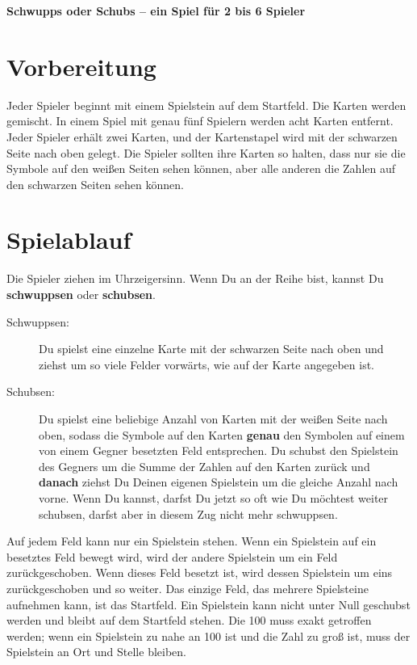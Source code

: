 \documentclass{article}
\begin{document}
{\center\LARGE\textbf{Schwupps oder Schubs -- ein Spiel für 2 bis 6 Spieler}}

\section*{Vorbereitung}

Jeder Spieler beginnt mit einem Spielstein auf dem Startfeld. Die Karten werden gemischt. In einem Spiel mit genau fünf Spielern werden acht Karten entfernt. Jeder Spieler erhält zwei Karten, und der Kartenstapel wird mit der schwarzen Seite nach oben gelegt. Die Spieler sollten ihre Karten so halten, dass nur sie die Symbole auf den weißen Seiten sehen können, aber alle anderen die Zahlen auf den schwarzen Seiten sehen können.

\section*{Spielablauf}

Die Spieler ziehen im Uhrzeigersinn. Wenn Du an der Reihe bist, kannst Du \textbf{schwuppsen} oder \textbf{schubsen}.

\begin{description}

\item[Schwuppsen:] 

Du spielst eine einzelne Karte mit der schwarzen Seite nach oben und ziehst um so viele Felder vorwärts, wie auf der Karte angegeben ist.

\item[Schubsen:]

Du spielst eine beliebige Anzahl von Karten mit der weißen Seite nach oben, sodass die Symbole auf den Karten \textbf{genau} den Symbolen auf einem von einem Gegner besetzten Feld entsprechen. Du schubst den Spielstein des Gegners um die Summe der Zahlen auf den Karten zurück und \textbf{danach} ziehst Du Deinen eigenen Spielstein um die gleiche Anzahl nach vorne. Wenn Du kannst, darfst Du jetzt so oft wie Du möchtest weiter schubsen, darfst aber in diesem Zug nicht mehr schwuppsen.

\end{description}

Auf jedem Feld kann nur ein Spielstein stehen. Wenn ein Spielstein auf ein besetztes Feld bewegt wird, wird der andere Spielstein um ein Feld zurückgeschoben. Wenn dieses Feld besetzt ist, wird dessen Spielstein um eins zurückgeschoben und so weiter. Das einzige Feld, das mehrere Spielsteine aufnehmen kann, ist das Startfeld. Ein Spielstein kann nicht unter Null geschubst werden und bleibt auf dem Startfeld stehen. Die 100 muss exakt getroffen werden; wenn ein Spielstein zu nahe an 100 ist und die Zahl zu groß ist, muss der Spielstein an Ort und Stelle bleiben.
\end{document}
